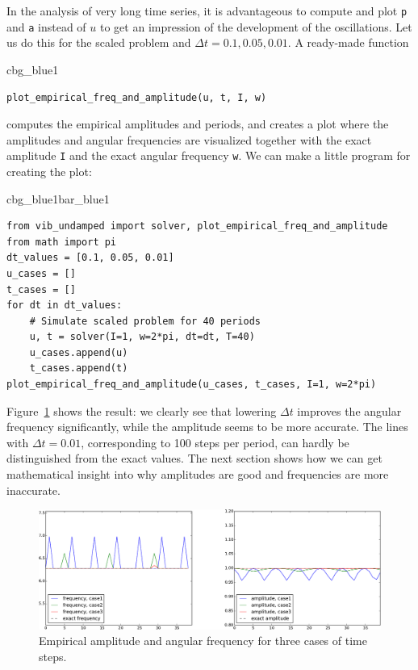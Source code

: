 \documentclass[%
oneside,                 %
final,                   %
10pt]{article}
\newenvironment{_cod_tight}[1]{
   \def\FrameCommand{\colorbox{#1}}
   \FrameRule0.6pt\MakeFramed {\FrameRestore}\vskip3mm}
   {\vskip0mm\endMakeFramed}
\newenvironment{cod}[1]{
\bgroup\rmfamily
\fboxsep=0mm\relax
\begin{_cod_tight}{#1}
\list{}{\parsep=-2mm\parskip=0mm\topsep=0pt\leftmargin=2mm
\rightmargin=2\leftmargin\leftmargin=4pt\relax}
\item\relax}
{\endlist\end{_cod_tight}\egroup}
\newenvironment{_pro_tight}[2]{
   \def\FrameCommand{\color{#2}\vrule width 1mm\normalcolor\colorbox{#1}}
   \FrameRule0.6pt\MakeFramed {\advance\hsize-2mm\FrameRestore}\vskip3mm}
   {\vskip0mm\endMakeFramed}
\newenvironment{pro}[2]{
\bgroup\rmfamily
\fboxsep=0mm\relax
\begin{_pro_tight}{#1}{#2}
\list{}{\parsep=-2mm\parskip=0mm\topsep=0pt\leftmargin=2mm
\rightmargin=2\leftmargin\leftmargin=4pt\relax}
\item\relax}
{\endlist\end{_pro_tight}\egroup}
\begin{document}
In the analysis of very long time series, it is advantageous to
compute and plot \texttt{p} and \texttt{a} instead of $u$ to get an impression of
the development of the oscillations. Let us do this for the scaled
problem and $\Delta t=0.1, 0.05, 0.01$.
A ready-made function

\begin{cod}{cbg_blue1}\begin{Verbatim}[numbers=none,fontsize=\fontsize{9pt}{9pt},baselinestretch=0.95,xleftmargin=2mm]
plot_empirical_freq_and_amplitude(u, t, I, w)
\end{Verbatim}
\end{cod}
\noindent
computes the empirical amplitudes and periods, and creates a plot
where the amplitudes and angular frequencies
are visualized together with the exact amplitude \texttt{I}
and the exact angular frequency \texttt{w}. We can make a little program
for creating the plot:

\begin{pro}{cbg_blue1}{bar_blue1}\begin{Verbatim}[numbers=none,fontsize=\fontsize{9pt}{9pt},baselinestretch=0.95,xleftmargin=2mm]
from vib_undamped import solver, plot_empirical_freq_and_amplitude
from math import pi
dt_values = [0.1, 0.05, 0.01]
u_cases = []
t_cases = []
for dt in dt_values:
    # Simulate scaled problem for 40 periods
    u, t = solver(I=1, w=2*pi, dt=dt, T=40)
    u_cases.append(u)
    t_cases.append(t)
plot_empirical_freq_and_amplitude(u_cases, t_cases, I=1, w=2*pi)
\end{Verbatim}
\end{pro}
\noindent
Figure~\ref{vib:ode1:fig:freq_ampl} shows the result: we clearly see that
lowering $\Delta t$ improves the angular frequency significantly, while the
amplitude seems to be more accurate.
The lines with
$\Delta t=0.01$, corresponding to 100 steps per period, can hardly be
distinguished from the exact values. The next section shows how we
can get mathematical insight into why amplitudes are good and frequencies
are more inaccurate.


\begin{figure}[!ht]  %
  \centerline{\includegraphics[width=1.0\linewidth]{fig-vib/empirical_ampl_freq.pdf}}
  \caption{
  Empirical amplitude and angular frequency for three cases of time steps. \label{vib:ode1:fig:freq_ampl}
  }
\end{figure}
\end{document}
